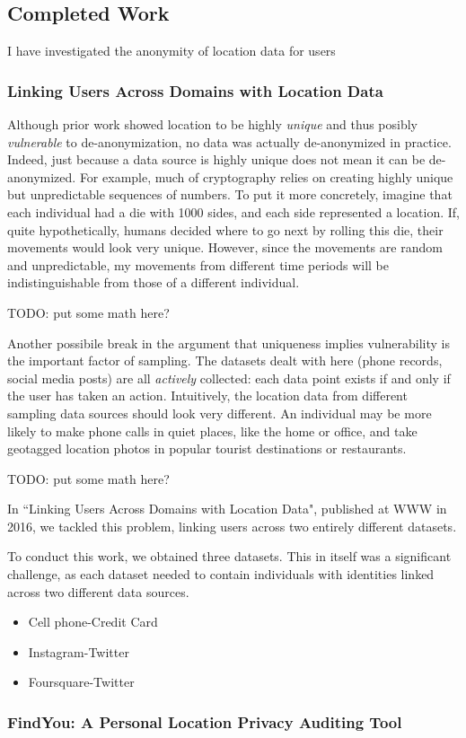 \subsection{Completed Work}
I have investigated the anonymity of location data for users

\subsubsection{Linking Users Across Domains with Location Data}
Although prior work showed location to be highly \emph{unique} and thus posibly \emph{vulnerable} to de-anonymization, no data was actually de-anonymized in practice.
Indeed, just because a data source is highly unique does not mean it can be de-anonymized.
For example, much of cryptography relies on creating highly unique but unpredictable sequences of numbers.
To put it more concretely, imagine that each individual had a die with 1000 sides, and each side represented a location.
If, quite hypothetically, humans decided where to go next by rolling this die, their movements would look very unique.
However, since the movements are random and unpredictable, my movements from different time periods will be indistinguishable from those of a different individual.

TODO: put some math here?

Another possibile break in the argument that uniqueness implies vulnerability is the important factor of sampling.
The datasets dealt with here (phone records, social media posts) are all \emph{actively} collected: each data point exists if and only if the user has taken an action.
Intuitively, the location data from different sampling data sources should look very different.
An individual may be more likely to make phone calls in quiet places, like the home or office, and take geotagged location photos in popular tourist destinations or restaurants.

TODO: put some math here?

In ``Linking Users Across Domains with Location Data", published at WWW in 2016, we tackled this problem, linking users across two entirely different datasets.


To conduct this work, we obtained three datasets.
This in itself was a significant challenge, as each dataset needed to contain individuals with identities linked across two different data sources.
\begin{itemize}
  \item Cell phone-Credit Card
  \item Instagram-Twitter
  \item Foursquare-Twitter
\end{itemize}


\subsubsection{FindYou: A Personal Location Privacy Auditing Tool}
